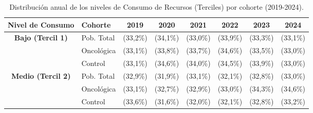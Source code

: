 \begin{table}[htbp]
\centering
\scriptsize
\setlength{\tabcolsep}{2pt}
\renewcommand{\arraystretch}{1.2}
\caption{Distribución anual de los niveles de Consumo de Recursos (Terciles) por cohorte (2019-2024).}
\label{tab:terciles_anuales_completos}
\begin{tabular}{|c|l|c|c|c|c|c|c|}
\hline
\parbox[t]{1.8cm}{\textbf{Nivel de Consumo}} & 
\parbox[t]{1.5cm}{\textbf{Cohorte}} & 
\parbox[t]{2cm}{\centering\textbf{2019}} & 
\parbox[t]{2cm}{\centering\textbf{2020}} & 
\parbox[t]{2cm}{\centering\textbf{2021}} & 
\parbox[t]{2cm}{\centering\textbf{2022}} & 
\parbox[t]{2cm}{\centering\textbf{2023}} & 
\parbox[t]{2cm}{\centering\textbf{2024}} \\ \hline

\parbox[t]{1.8cm}{\textbf{Bajo (Tercil 1)}} 
& \parbox[t]{1.5cm}{Pob. Total} & \parbox[t]{2cm}{ (33,2\%)} & \parbox[t]{2cm}{ (34,1\%)} & \parbox[t]{2cm}{ (33,0\%)} & \parbox[t]{2cm}{ (33,9\%)} & \parbox[t]{2cm}{ (33,3\%)} & \parbox[t]{2cm}{ (33,1\%)} \\ 
\parbox[t]{1.8cm}{} 
& \parbox[t]{1.5cm}{Oncológica} & \parbox[t]{2cm}{ (33,1\%)} & \parbox[t]{2cm}{ (33,8\%)} & \parbox[t]{2cm}{ (33,7\%)} & \parbox[t]{2cm}{ (34,6\%)} & \parbox[t]{2cm}{ (33,5\%)} & \parbox[t]{2cm}{ (33,0\%)} \\ 
\parbox[t]{1.8cm}{} 
& \parbox[t]{1.5cm}{Control} & \parbox[t]{2cm}{ (33,1\%)} & \parbox[t]{2cm}{ (34,6\%)} & \parbox[t]{2cm}{ (34,0\%)} & \parbox[t]{2cm}{ (34,5\%)} & \parbox[t]{2cm}{ (33,9\%)} & \parbox[t]{2cm}{ (33,0\%)} \\ \hline

\parbox[t]{1.8cm}{\textbf{Medio (Tercil 2)}} 
& \parbox[t]{1.5cm}{Pob. Total} & \parbox[t]{2cm}{ (32,9\%)} & \parbox[t]{2cm}{ (31,9\%)} & \parbox[t]{2cm}{ (33,1\%)} & \parbox[t]{2cm}{ (32,1\%)} & \parbox[t]{2cm}{ (32,8\%)} & \parbox[t]{2cm}{ (33,0\%)} \\ 
\parbox[t]{1.8cm}{} 
& \parbox[t]{1.5cm}{Oncológica} & \parbox[t]{2cm}{ (33,1\%)} & \parbox[t]{2cm}{ (32,7\%)} & \parbox[t]{2cm}{ (32,9\%)} & \parbox[t]{2cm}{ (33,0\%)} & \parbox[t]{2cm}{ (34,3\%)} & \parbox[t]{2cm}{ (34,6\%)} \\ 
\parbox[t]{1.8cm}{} 
& \parbox[t]{1.5cm}{Control} & \parbox[t]{2cm}{ (33,6\%)} & \parbox[t]{2cm}{ (31,6\%)} & \parbox[t]{2cm}{ (32,0\%)} & \parbox[t]{2cm}{ (32,1\%)} & \parbox[t]{2cm}{ (32,8\%)} & \parbox[t]{2cm}{ (33,2\%)} \\ \hline


\end{tabular}
\end{table}
